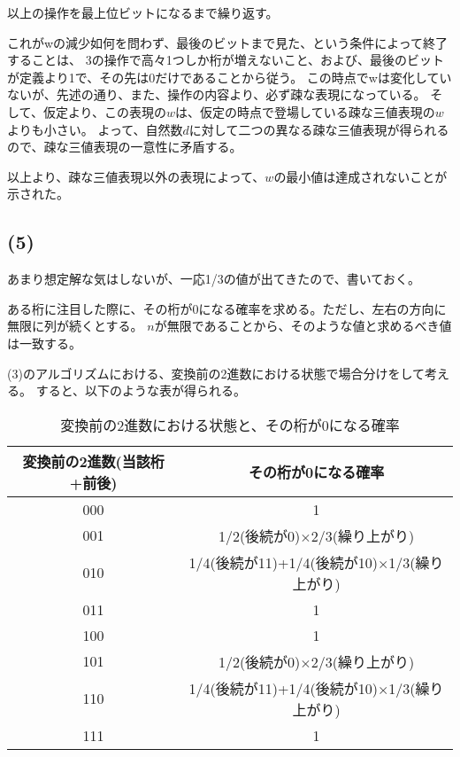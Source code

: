 \documentclass[a4paper, 10pt, dvipdfmx]{jlreq}
\begin{document}
以上の操作を最上位ビットになるまで繰り返す。

これがwの減少如何を問わず、最後のビットまで見た、という条件によって終了することは、
3の操作で高々1つしか桁が増えないこと、および、最後のビットが定義より1で、その先は0だけであることから従う。
この時点でwは変化していないが、先述の通り、また、操作の内容より、必ず疎な表現になっている。
そして、仮定より、この表現の$w$は、仮定の時点で登場している疎な三値表現の$w$よりも小さい。
よって、自然数$d$に対して二つの異なる疎な三値表現が得られるので、疎な三値表現の一意性に矛盾する。

以上より、疎な三値表現以外の表現によって、$w$の最小値は達成されないことが示された。

\subsection*{(5)}

あまり想定解な気はしないが、一応1/3の値が出てきたので、書いておく。

ある桁に注目した際に、その桁が0になる確率を求める。ただし、左右の方向に無限に列が続くとする。
$n$が無限であることから、そのような値と求めるべき値は一致する。

(3)のアルゴリズムにおける、変換前の2進数における状態で場合分けをして考える。
すると、以下のような表が得られる。

\begin{table}[hbtp]
  \caption{変換前の2進数における状態と、その桁が0になる確率}
  \centering
  \begin{tabular}{cc}
    \toprule
    変換前の2進数(当該桁+前後) & その桁が0になる確率                              \\
    \midrule
    000             & 1                                       \\
    001             & 1/2(後続が0)$\times$2/3(繰り上がり)             \\
    010             & 1/4(後続が11)+1/4(後続が10)$\times$1/3(繰り上がり) \\
    011             & 1                                       \\
    100             & 1                                       \\
    101             & 1/2(後続が0)$\times$2/3(繰り上がり)             \\
    110             & 1/4(後続が11)+1/4(後続が10)$\times$1/3(繰り上がり) \\
    111             & 1                                       \\
    \bottomrule
  \end{tabular}
\end{table}
\end{document}
